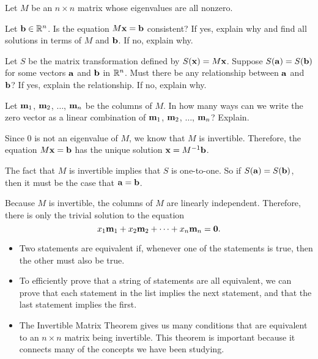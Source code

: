 \begin{example} Let $M$ be an $n \times n$ matrix whose eigenvalues are all nonzero.
\ba
\item Let $\mathbf{b} \in \mathbb{R}^n$. Is the equation $M \mathbf{x} = \mathbf{b}$ consistent? If yes, explain why and find all solutions in terms of $M$ and $\mathbf{b}$. If no, explain why.

\item Let $S$ be the matrix transformation defined by $S(\mathbf{x}) = M\mathbf{x}$. Suppose $S(\mathbf{a}) = S(\mathbf{b})$ for some vectors $\mathbf{a}$ and $\mathbf{b}$ in $\mathbb{R}^n$. Must there be any relationship between $\mathbf{a}$ and $\mathbf{b}$? If yes, explain the relationship. If no, explain why.

\item Let $\mathbf{m}_1$, $\mathbf{m}_2$, $\ldots$, $\mathbf{m}_n$ be the columns of $M$. In how many ways can we write the zero vector as a linear combination of $\mathbf{m}_1$, $\mathbf{m}_2$, $\ldots$, $\mathbf{m}_n$? Explain.

\ea
  


\ExampleSolution
\ba
\item Since $0$ is not an eigenvalue of $M$, we know that $M$ is invertible. Therefore, the equation $M \mathbf{x} = \mathbf{b}$ has the unique solution $\mathbf{x} = M^{-1} \mathbf{b}$.

\item The fact that $M$ is invertible implies that $S$ is one-to-one. So if $S(\mathbf{a}) = S(\mathbf{b})$, then it must be the case that $\mathbf{a} = \mathbf{b}$. 

\item Because $M$ is invertible, the columns of $M$ are linearly independent. Therefore, there is only the trivial solution to the equation 
\[x_1\mathbf{m}_1 + x_2\mathbf{m}_2 +  \cdots + x_n\mathbf{m}_n = \mathbf{0}.\] 

\ea

\end{example}

\label{sec:imt_summ}
\begin{itemize}
\item Two statements are equivalent if, whenever one of the statements is true, then the other must also be true. 
\item To efficiently prove that a string of statements are all equivalent, we can prove that each statement in the list implies the next statement, and that the last statement implies the first.  
\item The Invertible Matrix Theorem gives us many conditions that are equivalent to an $n \times n$ matrix being invertible. This theorem is important because it connects many of the concepts we have been studying. 
\end{itemize}


